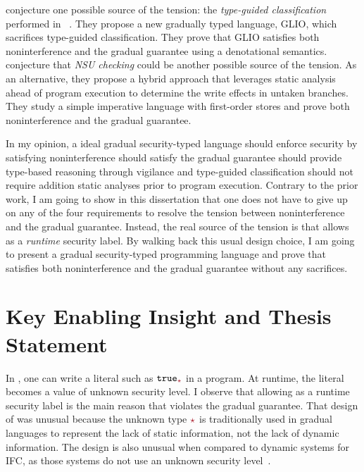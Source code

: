 \textcite{Amorim:2020aa} conjecture one possible source of the tension: the
\textit{type-guided classification} performed in
\GSLRef~\parencite{Toro:2018aa}. They propose a new gradually typed language,
GLIO, which sacrifices type-guided classification. They prove that GLIO
satisfies both noninterference and the gradual guarantee using a denotational
semantics.
%
\textcite{bichhawat2021gradual} conjecture that \textit{NSU checking} could be
another possible source of the tension. As an alternative, they propose a hybrid
approach that leverages static analysis ahead of program execution to determine
the write effects in untaken branches. They study a simple imperative language
with first-order stores and prove both noninterference and the gradual
guarantee.

In my opinion, a ideal gradual security-typed language  should
enforce security by satisfying noninterference  should satisfy the
gradual guarantee  should provide type-based reasoning through
vigilance and type-guided classification  should not require addition
static analyses prior to program execution. Contrary to the prior work, I am
going to show in this dissertation that one does not have to give up on any of
the four requirements to resolve the tension between noninterference and the
gradual guarantee. Instead, the real source of the tension is that \GSLRef
allows \unk as a \textit{runtime} security label. By walking back this usual
design choice, I am going to present a gradual security-typed programming
language \Surface and prove that \Surface satisfies both noninterference and the
gradual guarantee without any sacrifices.

\section{Key Enabling Insight and Thesis Statement}

In \GSLRef{}, one can write a literal such as $\true_{\unk}$ in a program. At
runtime, the literal becomes a value of unknown security level. I observe that
allowing \unk as a runtime security label is the main reason that \GSLRef
violates the gradual guarantee. That design of \GSLRef was unusual because the
unknown type $\unk$ is traditionally used in gradual languages to represent the
lack of static information, not the lack of dynamic information. The design is
also unusual when compared to dynamic systems for IFC, as those systems do not
use an unknown security
level~\parencite{Askarov:2009vq,austin2009efficient,Devriese:2010up,stefan2011flexible,Austin:2017uh}.

